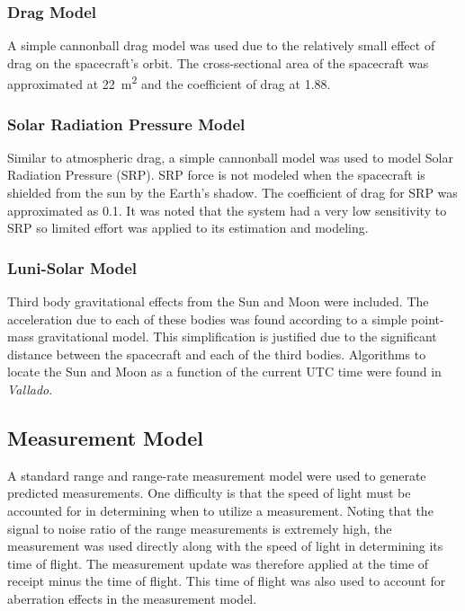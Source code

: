 \documentclass[11pt]{article}
\begin{document}
\subsubsection{Drag Model}

A simple cannonball drag model was used due to the relatively small effect of drag on the spacecraft's orbit. The cross-sectional area of the spacecraft was approximated at \SI{22}{\meter\squared} and the coefficient of drag at 1.88.

\subsubsection{Solar Radiation Pressure Model}

Similar to atmospheric drag, a simple cannonball model was used to model Solar Radiation Pressure (SRP). SRP force is not modeled when the spacecraft is shielded from the sun by the Earth's shadow. The coefficient of drag for SRP was approximated as 0.1. It was noted that the system had a very low sensitivity to SRP so limited effort was applied to its estimation and modeling.

\subsubsection{Luni-Solar Model}

Third body gravitational effects from the Sun and Moon were included. The acceleration due to each of these bodies was found according to a simple point-mass gravitational model. This simplification is justified due to the significant distance between the spacecraft and each of the third bodies. Algorithms to locate the Sun and Moon as a function of the current UTC time were found in \textit{Vallado}.

\subsection{Measurement Model}

A standard range and range-rate measurement model were used to generate predicted measurements. One difficulty is that the speed of light must be accounted for in determining when to utilize a measurement. Noting that the signal to noise ratio of the range measurements is extremely high, the measurement was used directly along with the speed of light in determining its time of flight. The measurement update was therefore applied at the time of receipt minus the time of flight. This time of flight was also used to account for aberration effects in the measurement model.
\end{document}
